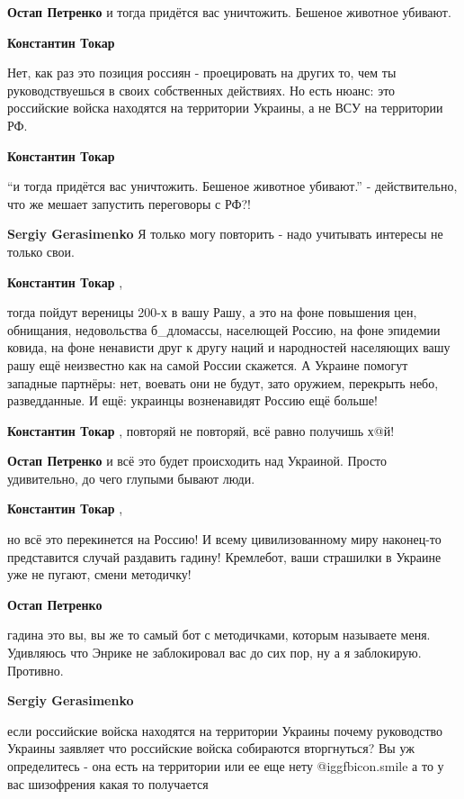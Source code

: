 \begin{itemize}
\begin{itemize}
\textbf{Остап Петренко} и тогда придётся вас уничтожить. Бешеное животное убивают.

\textbf{Константин Токар} 

Нет, как раз это позиция россиян - проецировать на других то, чем ты
руководствуешься в своих собственных действиях. Но есть нюанс: это российские
войска находятся на территории Украины, а не ВСУ на территории РФ.

\textbf{Константин Токар} 

\enquote{и тогда придётся вас уничтожить. Бешеное животное убивают.} -
действительно, что же мешает запустить переговоры с РФ?!

\textbf{Sergiy Gerasimenko} Я только могу повторить - надо учитывать интересы не только свои.

\textbf{Константин Токар} , 

тогда пойдут вереницы 200-х в вашу Рашу, а это на фоне повышения цен,
обнищания, недовольства б\_дломассы, населющей Россию, на фоне эпидемии ковида,
на фоне ненависти друг к другу наций и народностей населяющих вашу рашу ещё
неизвестно как на самой России скажется. А Украине помогут западные партнёры:
нет, воевать они не будут, зато оружием, перекрыть небо, разведданные. И ещё:
украинцы возненавидят Россию ещё больше!

\textbf{Константин Токар} , повторяй не повторяй, всё равно получишь х@й!

\textbf{Остап Петренко} и всё это будет происходить над Украиной. Просто удивительно, до чего глупыми бывают люди.

\textbf{Константин Токар} , 

но всё это перекинется на Россию! И всему цивилизованному миру наконец-то
представится случай раздавить гадину! Кремлебот, ваши страшилки в Украине уже
не пугают, смени методичку!

\textbf{Остап Петренко} 

гадина это вы, вы же то самый бот с методичками, которым называете меня.
Удивляюсь что Энрике не заблокировал вас до сих пор, ну а я заблокирую.
Противно.

\textbf{Sergiy Gerasimenko} 

если российские войска находятся на территории Украины почему руководство
Украины заявляет что российские войска собираются вторгнуться? Вы уж
определитесь - она есть на территории или ее еще нету  @igg{fbicon.smile}  а то у вас шизофрения
какая то получается


\end{itemize}
\end{itemize}
